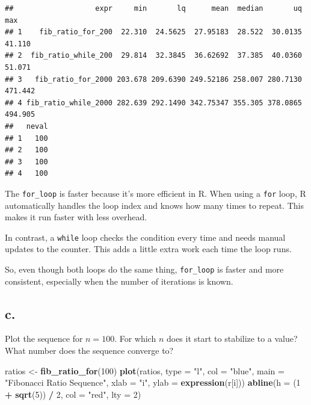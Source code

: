 \documentclass[
]{article}
\newenvironment{Shaded}{\begin{snugshade}}{\end{snugshade}}
\newcommand{\AttributeTok}[1]{\textcolor[rgb]{0.13,0.29,0.53}{#1}}
\newcommand{\DecValTok}[1]{\textcolor[rgb]{0.00,0.00,0.81}{#1}}
\newcommand{\FunctionTok}[1]{\textcolor[rgb]{0.13,0.29,0.53}{\textbf{#1}}}
\newcommand{\NormalTok}[1]{#1}
\newcommand{\OtherTok}[1]{\textcolor[rgb]{0.56,0.35,0.01}{#1}}
\newcommand{\SpecialCharTok}[1]{\textcolor[rgb]{0.81,0.36,0.00}{\textbf{#1}}}
\newcommand{\StringTok}[1]{\textcolor[rgb]{0.31,0.60,0.02}{#1}}
\begin{document}
\begin{verbatim}
##                   expr     min       lq      mean  median       uq     max
## 1    fib_ratio_for_200  22.310  24.5625  27.95183  28.522  30.0135  41.110
## 2  fib_ratio_while_200  29.814  32.3845  36.62692  37.385  40.0360  51.071
## 3   fib_ratio_for_2000 203.678 209.6390 249.52186 258.007 280.7130 471.442
## 4 fib_ratio_while_2000 282.639 292.1490 342.75347 355.305 378.0865 494.905
##   neval
## 1   100
## 2   100
## 3   100
## 4   100
\end{verbatim}

The \texttt{for\_loop} is faster because it's more efficient in R. When
using a \texttt{for} loop, R automatically handles the loop index and
knows how many times to repeat. This makes it run faster with less
overhead.

In contrast, a \texttt{while} loop checks the condition every time and
needs manual updates to the counter. This adds a little extra work each
time the loop runs.

So, even though both loops do the same thing, \texttt{for\_loop} is
faster and more consistent, especially when the number of iterations is
known.

\subsection{c.}\label{c.}

Plot the sequence for \(n=100\). For which \(n\) does it start to
stabilize to a value? What number does the sequence converge to?

\begin{Shaded}
\begin{Highlighting}[]
\NormalTok{ratios }\OtherTok{\textless{}{-}} \FunctionTok{fib\_ratio\_for}\NormalTok{(}\DecValTok{100}\NormalTok{)}
\FunctionTok{plot}\NormalTok{(ratios, }\AttributeTok{type =} \StringTok{"l"}\NormalTok{, }\AttributeTok{col =} \StringTok{"blue"}\NormalTok{, }\AttributeTok{main =} \StringTok{"Fibonacci Ratio Sequence"}\NormalTok{,}
     \AttributeTok{xlab =} \StringTok{"i"}\NormalTok{, }\AttributeTok{ylab =} \FunctionTok{expression}\NormalTok{(r[i]))}
\FunctionTok{abline}\NormalTok{(}\AttributeTok{h =}\NormalTok{ (}\DecValTok{1} \SpecialCharTok{+} \FunctionTok{sqrt}\NormalTok{(}\DecValTok{5}\NormalTok{)) }\SpecialCharTok{/} \DecValTok{2}\NormalTok{, }\AttributeTok{col =} \StringTok{"red"}\NormalTok{, }\AttributeTok{lty =} \DecValTok{2}\NormalTok{)}
\end{Highlighting}
\end{Shaded}
\end{document}
